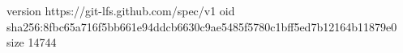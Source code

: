 version https://git-lfs.github.com/spec/v1
oid sha256:8fbc65a716f5bb661e94ddcb6630c9ae5485f5780c1bff5ed7b12164b11879e0
size 14744

